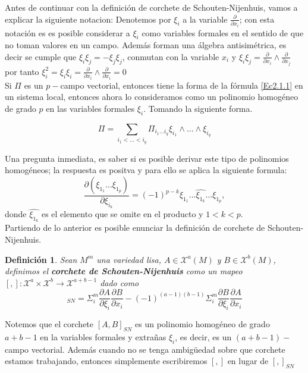 \documentclass[a4paper,10pt]{book}
\newtheorem{definicion}{Definici\'on}[chapter]
\begin{document}
Antes de continuar con la definici\'on de corchete de Schouten-Nijenhuis, vamos a explicar la siguiente notacion: Denotemos por $\xi_{i}$ a la variable $\frac{\partial}{\partial x_{i}}$; con esta notaci\'on es es posible considerar a $\xi_{i}$ como variables formales en el sentido de que no toman valores en un campo. Adem\'as forman una \'algebra antisim\'etrica, es decir se cumple que $\xi_{i}\xi_{j} = -\xi_{j}\xi_{j}$, conmutan con la variable $x_{i}$ y $\xi_{i}\xi_{j}=\frac{\partial}{\partial x_{i}}\wedge\frac{\partial}{\partial x_{j}}$ por tanto $\xi_{i}^{2} = \xi_{i}\xi_{i} = \frac{\partial}{\partial x_{i}}\wedge\frac{\partial}{\partial x_{i}} = 0$\\    

Si $\Pi$ es un $p-$campo vectorial, entonces tiene la forma de la f\'ormula \ref{Ec2.1.1} en un sistema local, entonces ahora lo consideramos como un polinomio homog\'eneo de grado $p$ en las variables formales $\xi_{i}$. Tomando la siguiente forma.

\begin{equation}
\Pi = \sum\limits_{i_{1}<...<i_{q}}\Pi_{i_{1}...i_{q}}\xi_{i_{1}}\wedge...\wedge\xi_{i_{q}}
\end{equation}

Una pregunta inmediata, es saber si es posible derivar este tipo de polinomios homog\'eneos; la respuesta es positva y para ello se aplica la siguiente formula:
$$\frac{\partial(\xi_{1_{1}}...\xi_{1_{p}})}{\partial\xi_{i_{k}}}=(-1)^{p-k}\xi_{1_{1}}...\hat{\xi_{1_{k}}}...\xi_{1_{p}},$$
donde $\hat{\xi_{1_{k}}}$ es el elemento que se omite en el producto y $1< k < p$.\\


Partiendo de lo anterior es posible enunciar la definici\'on de corchete de Schouten-Nijenhuis.

\begin{definicion}\label{DefCorSN}
Sean $M^{m}$ una variedad lisa, $A\in\mathcal{X}^{a}(M)$ y $B\in\mathcal{X}^{b}(M)$, definimos el {\bfseries corchete de Schouten-Nijenhuis} como un mapeo $[,]:\mathcal{X}^{a}\times\mathcal{X}^{b}\to\mathcal{X}^{a+b-1}$ dado como 
\begin{equation}
[A,B]_{SN}=\Sigma_{i}^{m}\frac{\partial A}{\partial\xi_{i}}\frac{\partial B}{\partial x_{i}}-(-1)^{(a-1)(b-1)}\Sigma_{i}^{m}\frac{\partial B}{\partial\xi_{i}}\frac{\partial A}{\partial x_{i}}
\end{equation}
\end{definicion}

Notemos que el corchete $[A,B]_{SN}$ es un polinomio homog\'eneo de grado $a+b-1$ en la variables formales y extra\~{n}as $\xi_{i}$, es decir, es un $(a+b-1)-$campo vectorial. Adem\'as cuando no se tenga ambig\"{u}edad sobre que corchete estamos trabajando, entonces simplemente escribiremos $[,]$ en lugar de $[,]_{SN}$
\end{document}
